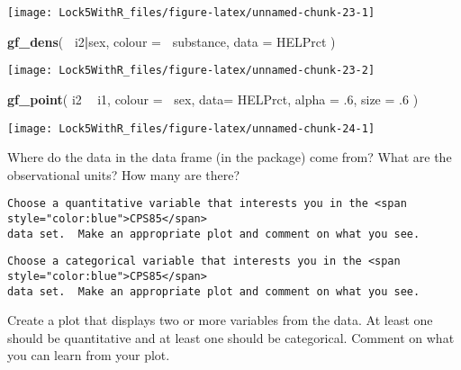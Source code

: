 \documentclass[]{book}
\newenvironment{Shaded}{\begin{snugshade}}{\end{snugshade}}
\newcommand{\DataTypeTok}[1]{\textcolor[rgb]{0.13,0.29,0.53}{#1}}
\newcommand{\FloatTok}[1]{\textcolor[rgb]{0.00,0.00,0.81}{#1}}
\newcommand{\KeywordTok}[1]{\textcolor[rgb]{0.13,0.29,0.53}{\textbf{#1}}}
\newcommand{\NormalTok}[1]{#1}
\newcommand{\OperatorTok}[1]{\textcolor[rgb]{0.81,0.36,0.00}{\textbf{#1}}}
\newcommand{\StringTok}[1]{\textcolor[rgb]{0.31,0.60,0.02}{#1}}
\begin{document}
\texttt{[image: Lock5WithR\_files/figure-latex/unnamed-chunk-23-1]}

\begin{Shaded}
\begin{Highlighting}[]
\KeywordTok{gf_dens}\NormalTok{( }\OperatorTok{~}\NormalTok{i2}\OperatorTok{|}\NormalTok{sex, }\DataTypeTok{colour =} \OperatorTok{~}\NormalTok{substance, }\DataTypeTok{data =}\NormalTok{ HELPrct )}
\end{Highlighting}
\end{Shaded}

\texttt{[image: Lock5WithR\_files/figure-latex/unnamed-chunk-23-2]}

\begin{Shaded}
\begin{Highlighting}[]
\KeywordTok{gf_point}\NormalTok{( i2 }\OperatorTok{~}\StringTok{ }\NormalTok{i1, }\DataTypeTok{colour =} \OperatorTok{~}\NormalTok{sex, }\DataTypeTok{data=}\NormalTok{ HELPrct, }\DataTypeTok{alpha =} \FloatTok{.6}\NormalTok{, }\DataTypeTok{size =} \FloatTok{.6}\NormalTok{ )}
\end{Highlighting}
\end{Shaded}

\texttt{[image: Lock5WithR\_files/figure-latex/unnamed-chunk-24-1]}

\begin{problem}
    \label{prob:CPS1}
    Where do the data in the  data frame (in the 
     package) come from?  What are the observational 
    units?  How many are there?
\end{problem}

\begin{verbatim}
Choose a quantitative variable that interests you in the <span style="color:blue">CPS85</span>
data set.  Make an appropriate plot and comment on what you see.
\end{verbatim}

\begin{verbatim}
Choose a categorical variable that interests you in the <span style="color:blue">CPS85</span>
data set.  Make an appropriate plot and comment on what you see.
\end{verbatim}

\begin{problem}
    \label{prob:CPSmulti}
    Create a plot that displays two or more variables from the 
     data.  At least one should be quantitative 
    and at least one should be categorical.
    Comment on what you can learn from your plot.
\end{problem}
\end{document}
